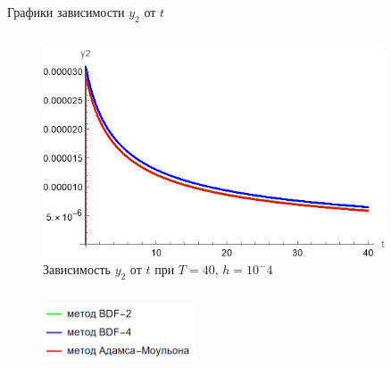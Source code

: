 \documentclass[ignoreonframetext,unicode]{beamer}
\begin{document}
\begin{frame}{Графики зависимости $y_2$ от $t$}
\begin{columns}
	\begin{figure}[!htbp]
		\centering
		\includegraphics[width=0.9\textwidth]{T-40-s1000-2}%
		\caption{Зависимость $y_2$ от $t$ при $T = 40$, $h = 10^-4$}
		\vspace*{-2mm}
		\label{T-40-s1000-2}
	\end{figure}

	\end{columns}

	\begin{figure}[!htbp]
	\centering
	\includegraphics[width=0.4\textwidth]{graph-legend}
	\end{figure}
\end{frame}
\end{document}
